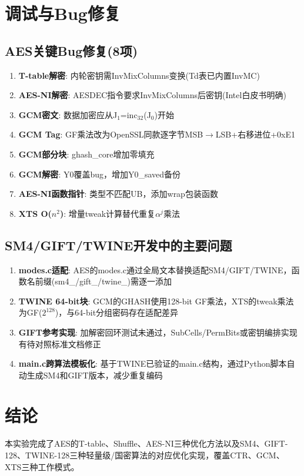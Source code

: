 \documentclass[12pt,a4paper]{ctexart}
\begin{document}
\section{调试与Bug修复}
\subsection{AES关键Bug修复(8项)}
\begin{enumerate}[itemsep=2pt]
\item \textbf{T-table解密}: 内轮密钥需InvMixColumns变换(Td表已内置InvMC)
\item \textbf{AES-NI解密}: AESDEC指令要求InvMixColumns后密钥(Intel白皮书明确)
\item \textbf{GCM密文}: 数据加密应从J$_1$=inc$_{32}$(J$_0$)开始
\item \textbf{GCM Tag}: GF乘法改为OpenSSL同款逐字节MSB$\to$LSB+右移进位+0xE1
\item \textbf{GCM部分块}: ghash\_core增加零填充
\item \textbf{GCM解密}: Y0覆盖bug，增加Y0\_saved备份
\item \textbf{AES-NI函数指针}: 类型不匹配UB，添加wrap包装函数
\item \textbf{XTS O($n^2$)}: 增量tweak计算替代重复$\alpha^j$乘法
\end{enumerate}

\subsection{SM4/GIFT/TWINE开发中的主要问题}
\begin{enumerate}[itemsep=2pt]
\item \textbf{modes.c适配}: AES的modes.c通过全局文本替换适配SM4/GIFT/TWINE，函数名前缀(sm4\_/gift\_/twine\_)需逐一添加
\item \textbf{TWINE 64-bit块}: GCM的GHASH使用128-bit GF乘法，XTS的tweak乘法为GF($2^{128}$)，与64-bit分组密码存在适配差异
\item \textbf{GIFT参考实现}: 加解密回环测试未通过，SubCells/PermBits或密钥编排实现有待对照标准文档修正
\item \textbf{main.c跨算法模板化}: 基于TWINE已验证的main.c结构，通过Python脚本自动生成SM4和GIFT版本，减少重复编码
\end{enumerate}

\newpage
\section{结论}
本实验完成了AES的T-table、Shuffle、AES-NI三种优化方法以及SM4、GIFT-128、TWINE-128三种轻量级/国密算法的对应优化实现，覆盖CTR、GCM、XTS三种工作模式。
\end{document}
